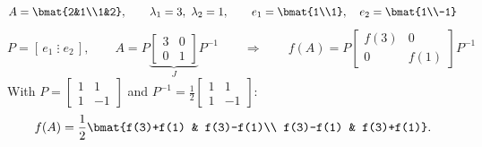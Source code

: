 \begin{example}
\[
A = \bmat{2&1\\1&2}, \qquad
\lambda_1 = 3,\ \lambda_2 = 1,
\qquad e_1 = \bmat{1\\1}, \quad e_2 = \bmat{1\\-1}
\]
\[
P = [\,e_1 \;\vdots\; e_2\,], \qquad A = P\underbrace{\left[\begin{array}{c|c}3&0\\ \hline 0&1\end{array}\right]}_{J}P^{-1}
\qquad\Rightarrow\qquad
f(A) = P\left[\begin{array}{c|c} f(3) & 0\\ \hline 0 & f(1)\end{array}\right]P^{-1}
\]
With $P=\left[\begin{smallmatrix}1&1\\1&-1\end{smallmatrix}\right]$ and $P^{-1}=\frac12\left[\begin{smallmatrix}1&1\\1&-1\end{smallmatrix}\right]$:
\[
f(A) = \frac12\bmat{f(3)+f(1) & f(3)-f(1)\\ f(3)-f(1) & f(3)+f(1)} .
\]
\end{example}

